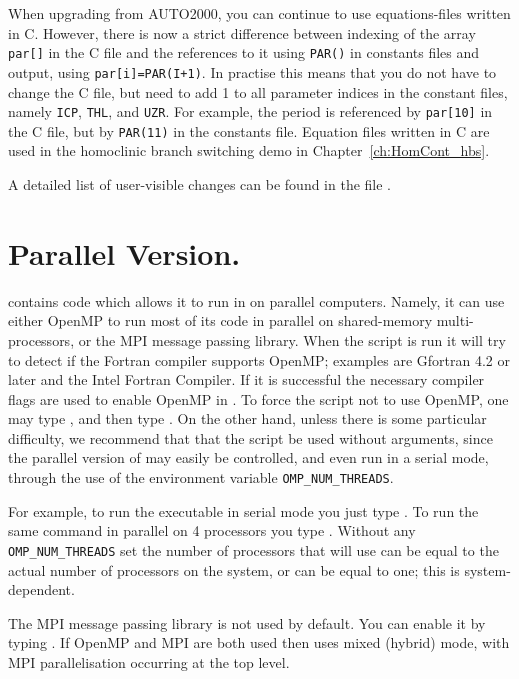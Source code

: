 \documentclass[12pt]{report}
\begin{document}
When upgrading from {\cal AUTO2000}, you can continue to use
equations-files written in C. However, there is now a strict
difference between indexing of the array {\tt par[]} in the
C file and the references to it using {\tt PAR()} in constants
files and output, using {\tt par[i]=PAR(I+1)}. In practise this
means that you do not have to change the C file, but need to
add 1 to all parameter indices in the constant files, namely
{\tt ICP}, {\tt THL}, and {\tt UZR}. For example,
the period is referenced by {\tt par[10]} in the C file,
but by {\tt PAR(11)} in the constants file. Equation files
written in C are used in the homoclinic branch switching
demo in Chapter~\ref{ch:HomCont_hbs}.
 
A detailed list of user-visible changes can be found in the file
.

\section{ Parallel Version.} \label{sec:Parallel}
\AUTO contains code which allows
it to run in on parallel computers.  Namely,
it can use either OpenMP to run most of its code in parallel
on shared-memory multi-processors, or the MPI message passing
library.
When the  script is run it will try to
detect if the Fortran compiler supports OpenMP; examples
are Gfortran 4.2 or later and the Intel Fortran Compiler.
If it is successful the necessary compiler flags are used
to enable OpenMP in \AUTO.
To force the  script not to use OpenMP,
one may type ,
and then type .
On the other hand, unless there is some
particular difficulty, we recommend that that the 
 script be used without arguments, since the
parallel version of \AUTO may easily be controlled,
and even run in a serial mode,  
through the use of the environment variable {\tt OMP\_NUM\_THREADS}.

For example, to run the \AUTO executable 
in serial mode you just type .
To run the same command in parallel on 4 processors you type 
. Without any {\tt OMP\_NUM\_THREADS}
set the number of processors that \AUTO will use can be equal to the
actual number of processors on the system, or can be equal to one;
this is system-dependent.

The MPI message passing library is not used by default. You can enable it
by typing  . If OpenMP and MPI are
both used then \AUTO uses mixed (hybrid) mode, with MPI parallelisation
occurring at the top level.
\end{document}
